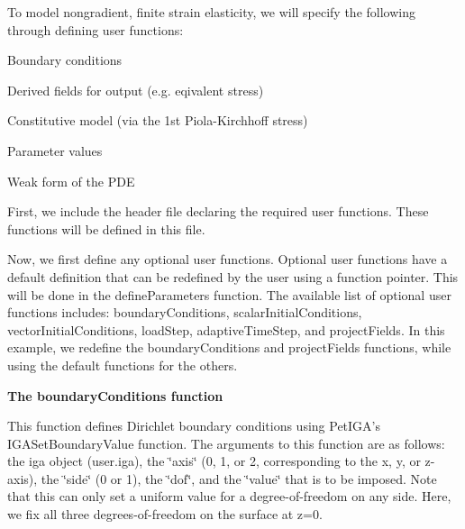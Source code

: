 

To model nongradient, finite strain elasticity, we will specify the following through defining user functions\-: \par

\begin{DoxyItemize}
\item Boundary conditions \par

\item Derived fields for output (e.\-g. eqivalent stress) \par

\item Constitutive model (via the 1st Piola-\/\-Kirchhoff stress) \par

\item Parameter values \par

\item Weak form of the P\-D\-E \par

\end{DoxyItemize}

First, we include the header file declaring the required user functions. These functions will be defined in this file.


\begin{DoxyCodeInclude}

\end{DoxyCodeInclude}


Now, we first define any optional user functions. Optional user functions have a default definition that can be redefined by the user using a function pointer. This will be done in the {\ttfamily define\-Parameters} function. The available list of optional user functions includes\-: {\ttfamily boundary\-Conditions}, {\ttfamily scalar\-Initial\-Conditions}, {\ttfamily vector\-Initial\-Conditions}, {\ttfamily load\-Step}, {\ttfamily adaptive\-Time\-Step}, and {\ttfamily project\-Fields}. In this example, we redefine the {\ttfamily boundary\-Conditions} and {\ttfamily project\-Fields} functions, while using the default functions for the others.

{\bfseries  The {\ttfamily boundary\-Conditions} function }

This function defines Dirichlet boundary conditions using Pet\-I\-G\-A's {\ttfamily I\-G\-A\-Set\-Boundary\-Value} function. The arguments to this function are as follows\-: the iga object (user.\-iga), the \char`\"{}axis\char`\"{} (0, 1, or 2, corresponding to the x, y, or z-\/axis), the \char`\"{}side\char`\"{} (0 or 1), the \char`\"{}dof\char`\"{}, and the \char`\"{}value\char`\"{} that is to be imposed. Note that this can only set a uniform value for a degree-\/of-\/freedom on any side. Here, we fix all three degrees-\/of-\/freedom on the surface at z=0.


